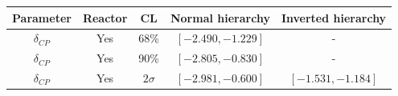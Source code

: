 \documentclass[11pt]{elsarticle}
\newcommand{\deltacp}{$\delta_{CP}$\xspace}
\begin{document}


\begin{table}[H]
	\centering
	\begin{tabular}{| c | c | c | c | c |}
		\hline
		Parameter & Reactor & CL & Normal hierarchy & Inverted hierarchy \\
		\hline
		\deltacp		& Yes & 68\% & $\left[ -2.490, -1.229 \right]$ & - \\
		\deltacp		& Yes & 90\% & $\left[ -2.805, -0.830 \right]$ & - \\
		\deltacp		& Yes & $ 2\sigma $ & $\left[ -2.981, -0.600 \right]$ & $\left[ -1.531, -1.184 \right]$ \\
		\hline
	\end{tabular}	
\end{table}
\end{document}
